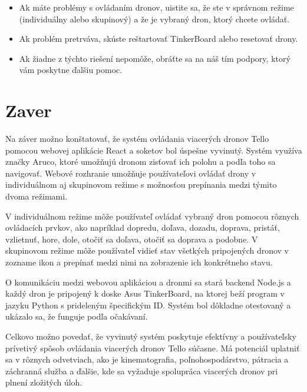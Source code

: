 \documentclass[a4paper]{feidippp}
\begin{document}
\begin{itemize}
\item Ak máte problémy s ovládaním dronov, uistite sa, že ste v správnom režime (individuálny alebo skupinový) a že je vybraný dron, ktorý chcete ovládať.
\item Ak problém pretrváva, skúste reštartovať TinkerBoard alebo resetovať drony.
\item Ak žiadne z týchto riešení nepomôže, obráťte sa na náš tím podpory, ktorý vám poskytne ďalšiu pomoc.
\end{itemize}

\newpage
\section{Zaver}

Na záver možno konštatovať, že systém ovládania viacerých dronov Tello pomocou webovej aplikácie React a soketov bol úspešne vyvinutý. Systém využíva značky Aruco, ktoré umožňujú dronom zisťovať ich polohu a podľa toho sa navigovať. Webové rozhranie umožňuje používateľovi ovládať drony v individuálnom aj skupinovom režime s možnosťou prepínania medzi týmito dvoma režimami.

V individuálnom režime môže používateľ ovládať vybraný dron pomocou rôznych ovládacích prvkov, ako napríklad dopredu, doľava, dozadu, doprava, pristáť, vzlietnuť, hore, dole, otočiť sa doľava, otočiť sa doprava a podobne. V skupinovom režime môže používateľ vidieť stav všetkých pripojených dronov v zozname ikon a prepínať medzi nimi na zobrazenie ich konkrétneho stavu.

O komunikáciu medzi webovou aplikáciou a dronmi sa stará backend Node.js a každý dron je pripojený k doske Asus TinkerBoard, na ktorej beží program v jazyku Python s prideleným špecifickým ID. Systém bol dôkladne otestovaný a ukázalo sa, že funguje podľa očakávaní.

Celkovo možno povedať, že vyvinutý systém poskytuje efektívny a používateľsky prívetivý spôsob ovládania viacerých dronov Tello súčasne. Má potenciál uplatniť sa v rôznych odvetviach, ako je kinematografia, poľnohospodárstvo, pátracia a záchranná služba a ďalšie, kde sa vyžaduje spolupráca viacerých dronov pri plnení zložitých úloh.

\end{document}
